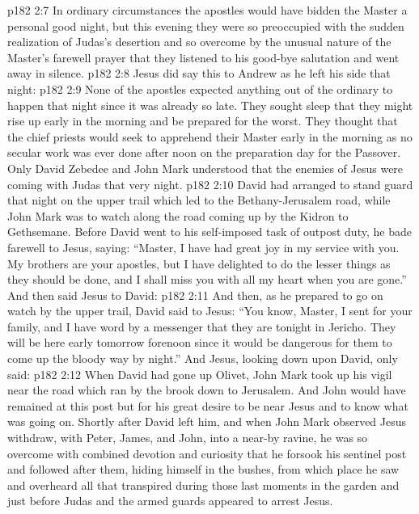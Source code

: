 \vs p182 2:7 \pc In ordinary circumstances the apostles would have bidden the Master a personal good night, but this evening they were so preoccupied with the sudden realization of Judas’s desertion and so overcome by the unusual nature of the Master’s farewell prayer that they listened to his good\hyp{}bye salutation and went away in silence.
\vs p182 2:8 Jesus did say this to Andrew as he left his side that night: 
\vs p182 2:9 None of the apostles expected anything out of the ordinary to happen that night since it was already so late. They sought sleep that they might rise up early in the morning and be prepared for the worst. They thought that the chief priests would seek to apprehend their Master early in the morning as no secular work was ever done after noon on the preparation day for the Passover. Only David Zebedee and John Mark understood that the enemies of Jesus were coming with Judas that very night.
\vs p182 2:10 \pc David had arranged to stand guard that night on the upper trail which led to the Bethany\hyp{}Jerusalem road, while John Mark was to watch along the road coming up by the Kidron to Gethsemane. Before David went to his self\hyp{}imposed task of outpost duty, he bade farewell to Jesus, saying: “Master, I have had great joy in my service with you. My brothers are your apostles, but I have delighted to do the lesser things as they should be done, and I shall miss you with all my heart when you are gone.” And then said Jesus to David: 
\vs p182 2:11 And then, as he prepared to go on watch by the upper trail, David said to Jesus: “You know, Master, I sent for your family, and I have word by a messenger that they are tonight in Jericho. They will be here early tomorrow forenoon since it would be dangerous for them to come up the bloody way by night.” And Jesus, looking down upon David, only said: 
\vs p182 2:12 \pc When David had gone up Olivet, John Mark took up his vigil near the road which ran by the brook down to Jerusalem. And John would have remained at this post but for his great desire to be near Jesus and to know what was going on. Shortly after David left him, and when John Mark observed Jesus withdraw, with Peter, James, and John, into a near\hyp{}by ravine, he was so overcome with combined devotion and curiosity that he forsook his sentinel post and followed after them, hiding himself in the bushes, from which place he saw and overheard all that transpired during those last moments in the garden and just before Judas and the armed guards appeared to arrest Jesus.
